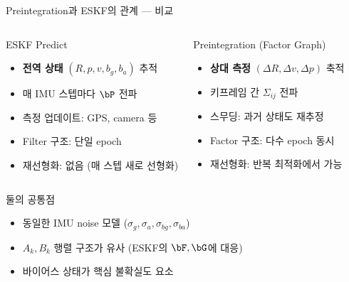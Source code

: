 \begin{frame}[shrink=10]{Preintegration과 ESKF의 관계 — 비교}

  \begin{columns}
    \begin{block}{ESKF Predict}
      \begin{itemize}
        \item \textbf{전역 상태} $(R, p, v, b_g, b_a)$ 추적
        \item 매 IMU 스텝마다 $\bP$ 전파
        \item 측정 업데이트: GPS, camera 등
        \item Filter 구조: 단일 epoch
        \item 재선형화: 없음 (매 스텝 새로 선형화)
      \end{itemize}
    \end{block}
    \begin{exampleblock}{Preintegration (Factor Graph)}
      \begin{itemize}
        \item \textbf{상대 측정} $(\Delta R, \Delta v, \Delta p)$ 축적
        \item 키프레임 간 $\Sigma_{ij}$ 전파
        \item 스무딩: 과거 상태도 재추정
        \item Factor 구조: 다수 epoch 동시
        \item 재선형화: 반복 최적화에서 가능
      \end{itemize}
    \end{exampleblock}
  \end{columns}

  \pause
  \vspace{0.4em}
  \begin{alertblock}{둘의 공통점}
    \begin{itemize}
      \item 동일한 IMU noise 모델 ($\sigma_g, \sigma_a, \sigma_{bg}, \sigma_{ba}$)
      \item $A_k, B_k$ 행렬 구조가 유사 (ESKF의 $\bF, \bG$에 대응)
      \item 바이어스 상태가 핵심 불확실도 요소
    \end{itemize}
  \end{alertblock}
\end{frame}

